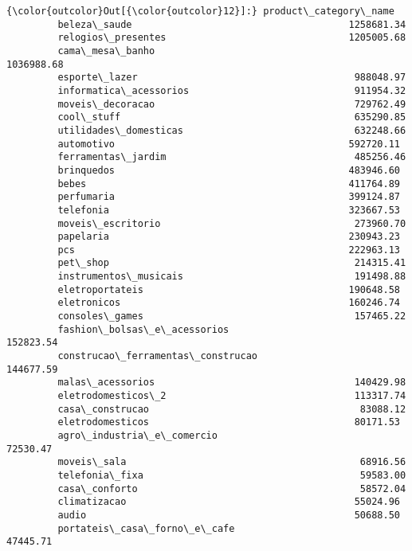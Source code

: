 \documentclass[11pt]{article}
\begin{document}
\begin{Verbatim}[commandchars=\\\{\}]
{\color{outcolor}Out[{\color{outcolor}12}]:} product\_category\_name
         beleza\_saude                                      1258681.34
         relogios\_presentes                                1205005.68
         cama\_mesa\_banho                                   1036988.68
         esporte\_lazer                                      988048.97
         informatica\_acessorios                             911954.32
         moveis\_decoracao                                   729762.49
         cool\_stuff                                         635290.85
         utilidades\_domesticas                              632248.66
         automotivo                                         592720.11
         ferramentas\_jardim                                 485256.46
         brinquedos                                         483946.60
         bebes                                              411764.89
         perfumaria                                         399124.87
         telefonia                                          323667.53
         moveis\_escritorio                                  273960.70
         papelaria                                          230943.23
         pcs                                                222963.13
         pet\_shop                                           214315.41
         instrumentos\_musicais                              191498.88
         eletroportateis                                    190648.58
         eletronicos                                        160246.74
         consoles\_games                                     157465.22
         fashion\_bolsas\_e\_acessorios                        152823.54
         construcao\_ferramentas\_construcao                  144677.59
         malas\_acessorios                                   140429.98
         eletrodomesticos\_2                                 113317.74
         casa\_construcao                                     83088.12
         eletrodomesticos                                    80171.53
         agro\_industria\_e\_comercio                           72530.47
         moveis\_sala                                         68916.56
         telefonia\_fixa                                      59583.00
         casa\_conforto                                       58572.04
         climatizacao                                        55024.96
         audio                                               50688.50
         portateis\_casa\_forno\_e\_cafe                         47445.71

\end{Verbatim}
\end{document}

